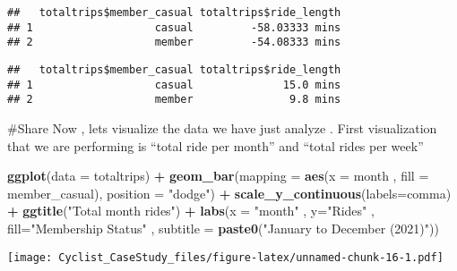\documentclass[
]{article}
\newenvironment{Shaded}{\begin{snugshade}}{\end{snugshade}}
\newcommand{\AttributeTok}[1]{\textcolor[rgb]{0.13,0.29,0.53}{#1}}
\newcommand{\FunctionTok}[1]{\textcolor[rgb]{0.13,0.29,0.53}{\textbf{#1}}}
\newcommand{\NormalTok}[1]{#1}
\newcommand{\SpecialCharTok}[1]{\textcolor[rgb]{0.81,0.36,0.00}{\textbf{#1}}}
\newcommand{\StringTok}[1]{\textcolor[rgb]{0.31,0.60,0.02}{#1}}
\begin{document}
\begin{verbatim}
##   totaltrips$member_casual totaltrips$ride_length
## 1                   casual         -58.03333 mins
## 2                   member         -54.08333 mins
\end{verbatim}

\begin{Shaded}
\end{Shaded}

\begin{verbatim}
##   totaltrips$member_casual totaltrips$ride_length
## 1                   casual              15.0 mins
## 2                   member               9.8 mins
\end{verbatim}

\#Share Now , lets visualize the data we have just analyze . First
visualization that we are performing is ``total ride per month'' and
``total rides per week''

\begin{Shaded}
\begin{Highlighting}[]
\FunctionTok{ggplot}\NormalTok{(}\AttributeTok{data =}\NormalTok{ totaltrips) }\SpecialCharTok{+} \FunctionTok{geom\_bar}\NormalTok{(}\AttributeTok{mapping =} \FunctionTok{aes}\NormalTok{(}\AttributeTok{x =}\NormalTok{ month , }\AttributeTok{fill =}\NormalTok{ member\_casual), }\AttributeTok{position =} \StringTok{"dodge"}\NormalTok{) }\SpecialCharTok{+} \FunctionTok{scale\_y\_continuous}\NormalTok{(}\AttributeTok{labels=}\NormalTok{comma) }\SpecialCharTok{+} \FunctionTok{ggtitle}\NormalTok{(}\StringTok{"Total month rides"}\NormalTok{) }\SpecialCharTok{+} \FunctionTok{labs}\NormalTok{(}\AttributeTok{x =} \StringTok{"month"}\NormalTok{ , }\AttributeTok{y=}\StringTok{"Rides"}\NormalTok{ , }\AttributeTok{fill=}\StringTok{"Membership Status"}\NormalTok{ , }\AttributeTok{subtitle =} \FunctionTok{paste0}\NormalTok{(}\StringTok{"January to December (2021)"}\NormalTok{))}
\end{Highlighting}
\end{Shaded}

\texttt{[image: Cyclist\_CaseStudy\_files/figure-latex/unnamed-chunk-16-1.pdf]}
\end{document}

